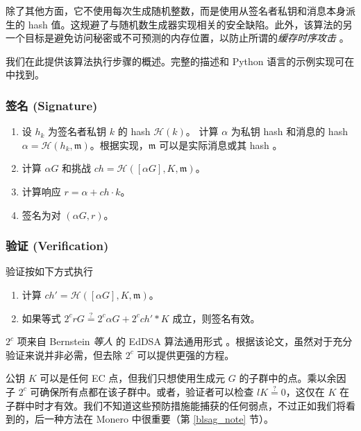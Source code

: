 除了其他方面，它不使用每次生成随机整数，而是使用从签名者私钥和消息本身派生的 hash 值。这规避了与随机数生成器实现相关的安全缺陷。此外，该算法的另一个目标是避免访问秘密或不可预测的内存位置，以防止所谓的{\em 缓存时序攻击} \cite{Bernstein2012}。

我们在此提供该算法执行步骤的概述。完整的描述和 Python 语言的示例实现可在 \cite{rfc8032} 中找到。

\subsubsection*{签名 (Signature)}

\begin{enumerate}
	\item 设 \(h_k\) 为签名者私钥 \(k\) 的 hash \(\mathcal{H}(k)\)。
	计算 \(\alpha\) 为私钥 hash 和消息的 hash \(\alpha = \mathcal{H}(h_k, \mathfrak{m})\)。根据实现，$\mathfrak{m}$ 可以是实际消息或其 hash \cite{rfc8032}。
	
	\item 计算 \(\alpha G\) 和挑战 $ch = \mathcal{H}([\alpha G], K,  \mathfrak{m})$。

	\item 计算响应 \(r = \alpha + ch \cdot k\)。
	
	\item 签名为对 \((\alpha G, r)\)。
\end{enumerate}

\subsubsection*{验证 (Verification)}
验证按如下方式执行

\begin{enumerate}
	\item 计算 \(ch' = \mathcal{H}([\alpha G], K,  \mathfrak{m})\)。
	
	\item 如果等式 \(2^c r G \stackrel{?}{=} 2^c \alpha G + 2^c ch'*K \) 成立，则签名有效。
\end{enumerate}

$2^c$ 项来自 Bernstein {\em 等人} 的 EdDSA 算法通用形式 \cite{Bernstein2012}。根据该论文，虽然对于充分验证来说并非必需，但去除 $2^c$ 可以提供更强的方程。

公钥 $K$ 可以是任何 EC 点，但我们只想使用生成元 $G$ 的子群中的点。乘以余因子 $2^c$ 可确保所有点都在该子群中。或者，验证者可以检查 $l K \stackrel{?}{=} 0$，这仅在 $K$ 在子群中时才有效。我们不知道这些预防措施能捕获的任何弱点，不过正如我们将看到的，后一种方法在 Monero 中很重要（第 \ref{blsag_note} 节）。

